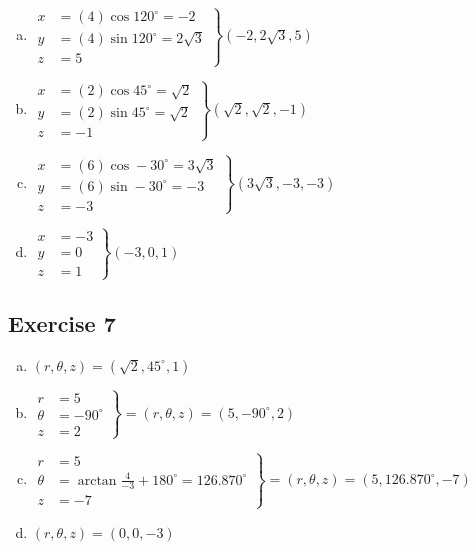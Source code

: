 \documentclass[11pt]{article}
\begin{document}
\begin{enumerate}[a.]
	\item %
	$
	\left.
	\begin{aligned}
		x &= (4)\cos 120^\circ = -2 \\
		y &= (4)\sin 120^\circ = 2\sqrt{3} \\
		z &= 5
		\end{aligned}
	\right\}(-2,2\sqrt{3},5)
	$
	\item %
	$
	\left.
	\begin{aligned}
		x &= (2)\cos 45^\circ = \sqrt{2} \\
		y &= (2)\sin 45^\circ = \sqrt{2} \\
		z &= -1
		\end{aligned}
	\right\}(\sqrt{2},\sqrt{2},-1)
	$
	\item %
	$
	\left.
	\begin{aligned}
		x &= (6)\cos -30^\circ = 3\sqrt{3} \\
		y &= (6)\sin -30^\circ = -3 \\
		z &= -3
		\end{aligned}
	\right\}(3\sqrt{3},-3,-3)
	$
	\item %
	$
	\left.
	\begin{aligned}
		x &= -3 \\
		y &= 0 \\
		z &= 1
		\end{aligned}
	\right\}(-3,0,1)
	$
\end{enumerate}


\subsection{Exercise 7}

\begin{enumerate}[a.]
	\item %
	$(r,\theta,z) = (\sqrt{2},45^\circ,1)$
	\item %
	$
	\left.
	\begin{aligned}
		r &= 5 \\
		\theta &= -90^\circ \\
		z &= 2
		\end{aligned}
	\right\} = (r,\theta,z) = (5,-90^\circ,2)
	$
	\item %
	$
	\left.
	\begin{aligned}
		r &= 5 \\
		\theta &= \arctan\frac{4}{-3}+180^\circ=126.870^\circ \\
		z &= -7
		\end{aligned}
	\right\} = (r,\theta,z) = (5,126.870^\circ,-7)
	$
	\item %
	$(r,\theta,z) = (0,0,-3)$
\end{enumerate}
\end{document}
